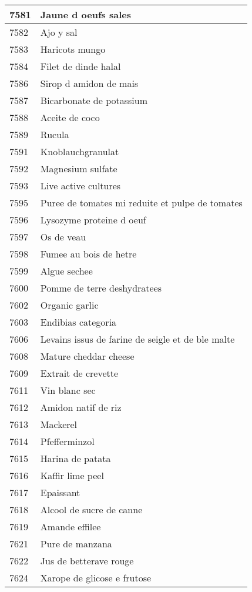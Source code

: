 \begin{longtable}{|l|l|}
7581 & Jaune d oeufs sales \\ \hline 
7582 & Ajo y sal \\ \hline 
7583 & Haricots mungo \\ \hline 
7584 & Filet de dinde halal \\ \hline 
7586 & Sirop d amidon de mais \\ \hline 
7587 & Bicarbonate de potassium \\ \hline 
7588 & Aceite de coco \\ \hline 
7589 & Rucula \\ \hline 
7591 & Knoblauchgranulat \\ \hline 
7592 & Magnesium sulfate \\ \hline 
7593 & Live active cultures \\ \hline 
7595 & Puree de tomates mi reduite et pulpe de tomates \\ \hline 
7596 & Lysozyme proteine d oeuf \\ \hline 
7597 & Os de veau \\ \hline 
7598 & Fumee au bois de hetre \\ \hline 
7599 & Algue sechee \\ \hline 
7600 & Pomme de terre deshydratees \\ \hline 
7602 & Organic garlic \\ \hline 
7603 & Endibias categoria \\ \hline 
7606 & Levains issus de farine de seigle et de ble malte \\ \hline 
7608 & Mature cheddar cheese \\ \hline 
7609 & Extrait de crevette \\ \hline 
7611 & Vin blanc sec \\ \hline 
7612 & Amidon natif de riz \\ \hline 
7613 & Mackerel \\ \hline 
7614 & Pfefferminzol \\ \hline 
7615 & Harina de patata \\ \hline 
7616 & Kaffir lime peel \\ \hline 
7617 & Epaissant \\ \hline 
7618 & Alcool de sucre de canne \\ \hline 
7619 & Amande effilee \\ \hline 
7621 & Pure de manzana \\ \hline 
7622 & Jus de betterave rouge \\ \hline 
7624 & Xarope de glicose e frutose \\ \hline 

\end{longtable}
